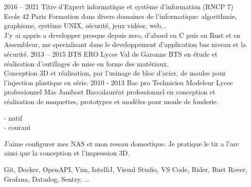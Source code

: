 \documentclass[8pt]{developercv} %
\begin{document}
\begin{entrylist}
	\entry
		{2016 -- 2021}
		{Titre d'Expert informatique et système d'information (RNCP 7)}
		{Ecole 42 Paris}
		{
			Formation dans divers domaines de l'informatique: algorithmie, graphisme, système UNIX, sécurité, jeux vidéos, web...\\
			J'y ai appris a developper presque depuis zero, d'abord en C puis en Rust et en Assembleur, me specialisant dans le developpement d'application bas niveau et la sécurité.
		}
	\entry
		{2013 -- 2015}
		{BTS ERO}
		{Lycee Val de Garonne}
		{
			BTS en étude et réalisation d'outillages de mise en forme des matériaux.\\
			Conception 3D et réalisation, par l'usinage de bloc d'acier, de moules pour l'injection plastique en série.
		}
	\entry
		{2010 - 2013}
		{Bac pro Technicien Modeleur}
		{Lycee professionnel Mas Jambost}
		{
			Baccalauréat professionnel en conception et réalisation de maquettes, prototypes et modèles pour moule de fonderie.
		}
\end{entrylist}

\vfill %
\begin{minipage}[t]{0.2\textwidth} %
	\vspace{-\baselineskip} %


	 - natif\\
	 - courant\\
\end{minipage}
\hfill
\begin{minipage}[t]{0.35\textwidth} %
	\vspace{-\baselineskip} %


	J'aime configurer mes NAS et mon reseau domestique. Je pratique le tir a l'arc ainsi que la conception et l'impression 3D.
\end{minipage}
\hfill
\begin{minipage}[t]{0.35\textwidth} %
	\vspace{-\baselineskip} %


	Git, Docker, OpenAPI, Vim, IntelliJ, Visual Studio, VS Code, Rider, Rust Rover, Grafana, Datadog, Sentry, ...
\end{minipage}
\vspace{\baselineskip}
\end{document}

